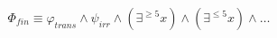 \documentclass[preview]{standalone}
\begin{document}
\begin{align*}
\Phi_{fin} \equiv  \varphi_{trans} \land \psi_{irr} \land (\exists^{\ge 5} x) \land (\exists^{\le 5} x) \land \dots
\end{align*}
\end{document}
